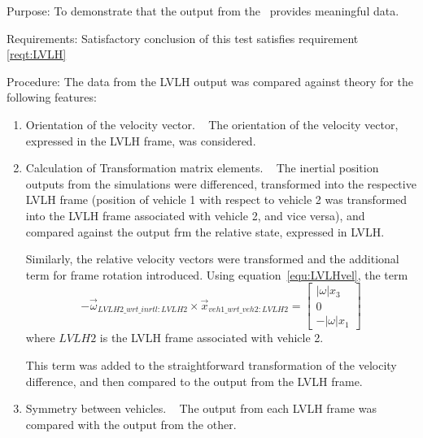 \begin{description}
\item{Purpose:}\newline
To demonstrate that the output from the \LVLHDesc\ provides meaningful data.

\item{Requirements:}\newline
Satisfactory conclusion of this test satisfies requirement \ref{reqt:LVLH}

\item{Procedure:}\newline
The data from the LVLH output was compared against theory for the following features:
\begin{enumerate}
 \item  {Orientation of the velocity vector.} \ \newline
The orientation of the velocity vector, expressed in the LVLH frame, was considered.

 \item {Calculation of Transformation matrix elements.} \ \newline
The inertial position outputs from the simulations were differenced, transformed into the respective LVLH frame (position of vehicle 1 with respect to vehicle 2 was transformed into the LVLH frame associated with vehicle 2, and vice versa), and compared against the output frm the relative state, expressed in LVLH.

Similarly, the relative velocity vectors were transformed and the additional term for frame rotation introduced.  Using equation~\vref{equ:LVLHvel}, the term
\begin{equation*}
 - \vec \omega_{LVLH2\_wrt\_inrtl:LVLH2} \times \vec x_{veh1\_wrt\_veh2:LVLH2} = \begin{bmatrix} \lvert \omega \rvert x_3 \\ 0 \\ -\lvert \omega \rvert x_1 \end{bmatrix} 
\end{equation*}
where $LVLH2$ is the LVLH frame associated with vehicle 2.

This term was added to the straightforward transformation of the velocity difference, and then compared to the output from the LVLH frame.

\item {Symmetry between vehicles.} \ \newline
The output from each LVLH frame was compared with the output from the other.
\end{enumerate}



\end{description}
